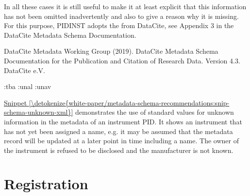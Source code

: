 \documentclass[a4paper,10pt,english]{sphinxmanual}
\begin{document}
In all these cases it is still useful to make it at least explicit
that this information has not been omitted inadvertently and also to
give a reason why it is missing.  For this purpose, PIDINST adopts the
 from DataCite, see Appendix
3 in the DataCite Metadata Schema Documentation. %
\begin{footnote}[3]\sphinxAtStartFootnote
DataCite Metadata Working Group (2019).  DataCite Metadata Schema
Documentation for the Publication and Citation of Research Data.
Version 4.3.  DataCite e.V.  
%
\end{footnote}
\def\sphinxLiteralBlockLabel{\label{\detokenize{white-paper/metadata-schema-recommendations:id6}}\label{\detokenize{white-paper/metadata-schema-recommendations:snip-schema-unknown-xml}}}
\begin{sphinxVerbatim}[commandchars=\\\{\}]
  :tba
        :unal
        :unav
\end{sphinxVerbatim}

\hyperref[\detokenize{white-paper/metadata-schema-recommendations:snip-schema-unknown-xml}]{Snippet \ref{\detokenize{white-paper/metadata-schema-recommendations:snip-schema-unknown-xml}}} demonstrates the use of standard
values for unknown information in the metadata of an instrument PID.
It shows an instrument that has not yet been assigned a name, e.g. it
may be assumed that the metadata record will be updated at a later
point in time including a name.  The owner of the instrument is
refused to be disclosed and the manufacturer is not known.


\section{Registration}
\label{\detokenize{white-paper/registration:registration}}\label{\detokenize{white-paper/registration::doc}}
\end{document}
